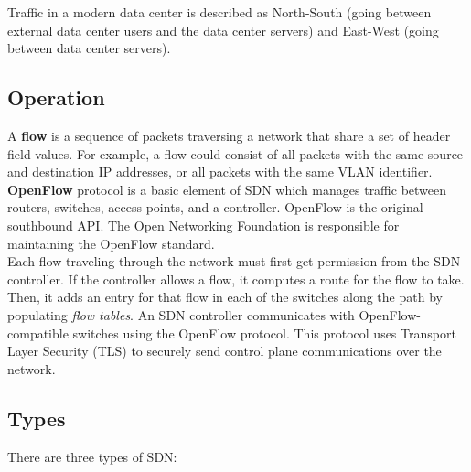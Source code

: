 \note Traffic in a modern data center is described as North-South (going between external data center users and the data center servers) and East-West (going between data center servers).\\

\subsection{Operation}

A \textbf{flow} is a sequence of packets traversing a network that share a set of header field values. For example, a flow could consist of all packets with the same source and destination IP addresses, or all packets with the same VLAN identifier.\\

\textbf{OpenFlow} protocol is a basic element of SDN which manages traffic between routers, switches, access points, and a controller. OpenFlow is the original southbound API. The Open Networking Foundation is responsible for maintaining the OpenFlow standard.\\

Each flow traveling through the network must first get permission from the SDN controller. If the controller allows a flow, it computes a route for the flow to take. Then, it adds an entry for that flow in each of the switches along the path by populating \emph{flow tables}. An SDN controller communicates with OpenFlow-compatible switches using the OpenFlow protocol. This protocol uses Transport Layer Security (TLS) to securely send control plane communications over the network.

\subsection{Types}

There are three types of SDN:

